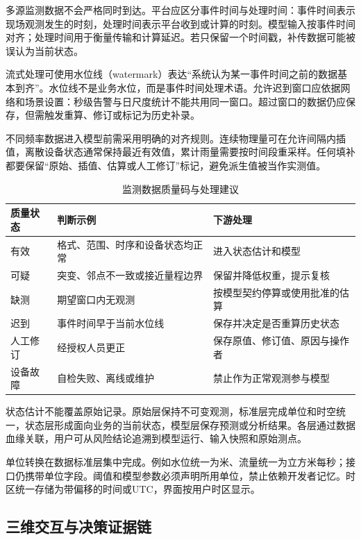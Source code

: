 多源监测数据不会严格同时到达。平台应区分事件时间与处理时间：事件时间表示现场观测发生的时刻，处理时间表示平台收到或计算的时刻。模型输入按事件时间对齐；处理时间用于衡量传输和计算延迟。若只保留一个时间戳，补传数据可能被误认为当前状态。

流式处理可使用水位线（watermark）表达“系统认为某一事件时间之前的数据基本到齐”。水位线不是业务水位，而是事件时间处理术语。允许迟到窗口应依据网络和场景设置：秒级告警与日尺度统计不能共用同一窗口。超过窗口的数据仍应保存，但需触发重算、修订或标记为历史补录。

不同频率数据进入模型前需采用明确的对齐规则。连续物理量可在允许间隔内插值，离散设备状态通常保持最近有效值，累计雨量需要按时间段重采样。任何填补都要保留“原始、插值、估算或人工修订”标记，避免派生值被当作实测值。

\begin{table}[htbp]
\centering
\caption{监测数据质量码与处理建议}
\label{tab:dt-quality-flags}
\begin{tabular}{p{2.4cm}p{4.5cm}p{5.8cm}}
\toprule
质量状态 & 判断示例 & 下游处理 \\
\midrule
有效 & 格式、范围、时序和设备状态均正常 & 进入状态估计和模型 \\
可疑 & 突变、邻点不一致或接近量程边界 & 保留并降低权重，提示复核 \\
缺测 & 期望窗口内无观测 & 按模型契约停算或使用批准的估算 \\
迟到 & 事件时间早于当前水位线 & 保存并决定是否重算历史状态 \\
人工修订 & 经授权人员更正 & 保存原值、修订值、原因与操作者 \\
设备故障 & 自检失败、离线或维护 & 禁止作为正常观测参与模型 \\
\bottomrule
\end{tabular}
\end{table}

状态估计不能覆盖原始记录。原始层保持不可变观测，标准层完成单位和时空统一，状态层形成面向业务的当前状态，模型层保存预测或分析结果。各层通过数据血缘关联，用户可从风险结论追溯到模型运行、输入快照和原始测点。

单位转换在数据标准层集中完成。例如水位统一为米、流量统一为立方米每秒；接口仍携带单位字段。阈值和模型参数必须声明所用单位，禁止依赖开发者记忆。时区统一存储为带偏移的时间或UTC，界面按用户时区显示。

\subsection{三维交互与决策证据链}

